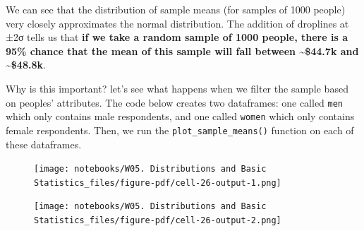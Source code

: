 \documentclass[
  letterpaper,
  DIV=11,
  numbers=noendperiod]{scrreprt}
\newenvironment{Shaded}{\begin{snugshade}}{\end{snugshade}}
\newcommand{\CommentTok}[1]{\textcolor[rgb]{0.37,0.37,0.37}{#1}}
\newcommand{\DecValTok}[1]{\textcolor[rgb]{0.68,0.00,0.00}{#1}}
\newcommand{\NormalTok}[1]{\textcolor[rgb]{0.00,0.23,0.31}{#1}}
\newcommand{\OperatorTok}[1]{\textcolor[rgb]{0.37,0.37,0.37}{#1}}
\newcommand{\StringTok}[1]{\textcolor[rgb]{0.13,0.47,0.30}{#1}}
\begin{document}
We can see that the distribution of sample means (for samples of 1000
people) very closely approximates the normal distribution. The addition
of droplines at ±2σ tells us that \textbf{if we take a random sample of
1000 people, there is a 95\% chance that the mean of this sample will
fall between \textasciitilde\$44.7k and \textasciitilde\$48.8k}.

Why is this important? let's see what happens when we filter the sample
based on peoples' attributes. The code below creates two dataframes: one
called \texttt{men} which only contains male respondents, and one called
\texttt{women} which only contains female respondents. Then, we run the
\texttt{plot\_sample\_means()} function on each of these dataframes.

\begin{Shaded}
\end{Shaded}

\begin{figure}[H]

{\centering \texttt{[image: notebooks/W05. Distributions and Basic Statistics\_files/figure-pdf/cell-26-output-1.png]}

}

\end{figure}

\begin{figure}[H]

{\centering \texttt{[image: notebooks/W05. Distributions and Basic Statistics\_files/figure-pdf/cell-26-output-2.png]}

}

\end{figure}
\end{document}
